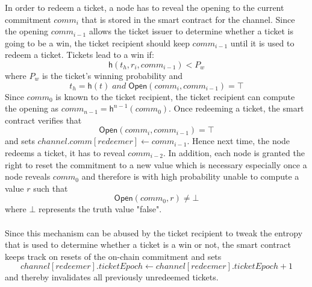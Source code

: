 In order to redeem a ticket, a node has to reveal the opening to the current
commitment $comm_i$ that is stored in the smart contract for the channel. Since
the opening $comm_{i-1}$ allows the ticket issuer to determine whether a ticket
is going to be a win, the ticket recipient should keep $comm_{i-1}$ until it is
used to redeem a ticket. Tickets lead to a win if: $$\mathsf{h}( t_h, r_i,
comm_{i-1} ) < P_w$$ where $P_w$ is the ticket's winning probability and
$$t_h=\mathsf{h}(t) \;and\; \mathsf{Open}(comm_i, comm_{i-1}) = \top$$ Since
$comm_{0}$ is known to the ticket recipient, the ticket recipient can compute
the opening as $comm_{n-1} = \mathsf{h}^{n-1}(comm_0)$. Once redeeming a ticket,
the smart contract verifies that $$\mathsf{Open}(comm_i, comm_{i-1}) = \top$$
and sets $channel.comm[redeemer] \leftarrow comm_{i-1}$. Hence next time, the
node redeems a ticket, it has to reveal $comm_{i-2}$. In addition, each node is
granted the right to reset the commitment to a new value which is necessary
especially once a node reveals $comm_0$ and therefore is with high probability
unable to compute a value $r$ such that $$\mathsf{Open}(comm_0,r) \neq \bot$$
where $\bot$ represents the truth value "false". \\~\\Since this mechanism can
be abused by the ticket recipient to tweak the entropy that is used to determine
whether a ticket is a win or not, the smart contract keeps track on resets of
the on-chain commitment and sets $$channel[redeemer].ticketEpoch \leftarrow
channel[redeemer].ticketEpoch +1$$ and thereby invalidates all previously
unredeemed tickets.
